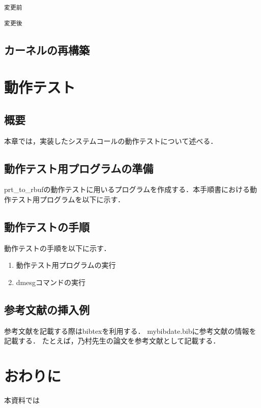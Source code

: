 \documentclass[12pt]{jsarticle}
\begin{document}
\begin{verbatim}
変更前
\end{verbatim}

\begin{verbatim}
変更後
\end{verbatim}
\subsection{カーネルの再構築}

\section{動作テスト}
\subsection{概要}
本章では，実装したシステムコールの動作テストについて述べる．
\subsection{動作テスト用プログラムの準備}
prt\_to\_rbufの動作テストに用いるプログラムを作成する．本手順書における動作テスト用プログラムを以下に示す．
\subsection{動作テストの手順}
動作テストの手順を以下に示す．
\begin{enumerate}
\item 動作テスト用プログラムの実行
\item dmesgコマンドの実行
\end{enumerate}
\subsection{参考文献の挿入例}
参考文献を記載する際はbibtexを利用する．
mybibdate.bibに参考文献の情報を記載する．
たとえば，乃村先生の論文\cite{nom2011c}を参考文献として記載する．

\section{おわりに}

本資料では



\end{document}
